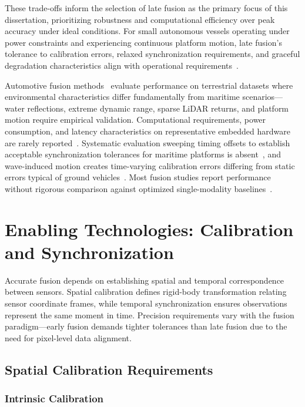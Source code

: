\documentclass[../main.tex]{subfiles}
\begin{document}
These trade-offs inform the selection of late fusion as the primary focus of this dissertation, prioritizing robustness and computational efficiency over peak accuracy under ideal conditions.
For small autonomous vessels operating under power constraints and experiencing continuous platform motion, late fusion's tolerance to calibration errors, relaxed synchronization requirements, and graceful degradation characteristics align with operational requirements~\cite{huang2024, wang2020a}.

Automotive fusion methods~\cite{feng2021, cui2022, huang2024} evaluate performance on terrestrial datasets where environmental characteristics differ fundamentally from maritime scenarios---water reflections, extreme dynamic range, sparse \ac{LiDAR} returns, and platform motion require empirical validation.
Computational requirements, power consumption, and latency characteristics on representative embedded hardware are rarely reported~\cite{liu2023a}.
Systematic evaluation sweeping timing offsets to establish acceptable synchronization tolerances for maritime platforms is absent~\cite{huang2024}, and wave-induced motion creates time-varying calibration errors differing from static errors typical of ground vehicles~\cite{cui2022}.
Most fusion studies report performance without rigorous comparison against optimized single-modality baselines~\cite{farahnakian2020, haghbayan2018, clunie2021}.

\section{Enabling Technologies: Calibration and Synchronization}

Accurate fusion depends on establishing spatial and temporal correspondence between sensors.
Spatial calibration defines rigid-body transformation relating sensor coordinate frames, while temporal synchronization ensures observations represent the same moment in time.
Precision requirements vary with the fusion paradigm---early fusion demands tighter tolerances than late fusion due to the need for pixel-level data alignment.

\subsection{Spatial Calibration Requirements}

\subsubsection{Intrinsic Calibration}
\end{document}
